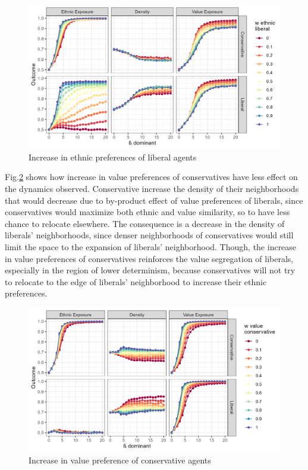\documentclass[
]{article}
\begin{document}
\begin{figure}[H]
    \centering
    \includegraphics{images/libeth.jpg}
    \caption{Increase in ethnic preferences of liberal agents}
    \label{fig:libeth}
\end{figure}

Fig.\ref{fig:conval} shows how increase in value preferences of conservatives have less effect on the dynamics observed. Conservative increase the density of their neighborhoods that would decrease due to by-product effect of value preferences of liberals, since conservatives would maximize both ethnic and value similarity, so to have less chance to relocate elsewhere. The consequence is a decrease in the density of liberals' neighborhoods, since denser neighborhoods of conservatives would still limit the space to the expansion of liberals' neighborhood. Though, the increase in value preferences of conservatives reinforces the value segregation of liberals, especially in the region of lower determinism, because conservatives will not try to relocate to the edge of liberals' neighborhood to increase their ethnic preferences.

\begin{figure}[H]
    \centering
    \includegraphics{images/conval.jpg}
    \caption{Increase in value preference of conservative agents}
    \label{fig:conval}
\end{figure}
\end{document}
